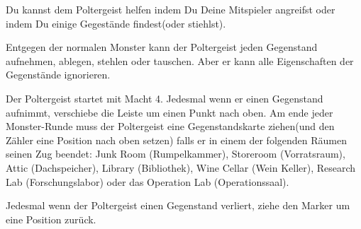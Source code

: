 





Du kannst dem Poltergeist helfen indem Du Deine Mitspieler angreifst oder indem Du einige Gegestände findest(oder stiehlst).


Entgegen der normalen Monster kann der Poltergeist jeden Gegenstand aufnehmen, ablegen, stehlen oder tauschen.
Aber er kann alle Eigenschaften der Gegenstände ignorieren.

  \begin{itemize}
        \bitem Der Poltergeist startet mit Macht 4.
Jedesmal wenn er einen Gegenstand aufnimmt, verschiebe die Leiste um einen Punkt nach oben.
Am ende jeder Monster-Runde muss der Poltergeist eine Gegenstandskarte ziehen(und den Zähler eine Position nach oben setzen) falls er in einem der folgenden Räumen seinen Zug beendet:
Junk Room (Rumpelkammer), Storeroom (Vorratsraum), Attic (Dachspeicher),  Library (Bibliothek),  Wine Cellar (Wein Keller), Research Lab (Forschungslabor) oder das Operation Lab (Operationssaal).

        \bitem Jedesmal wenn der Poltergeist einen Gegenstand verliert, ziehe den Marker um eine Position zurück.

    \end{itemize}


